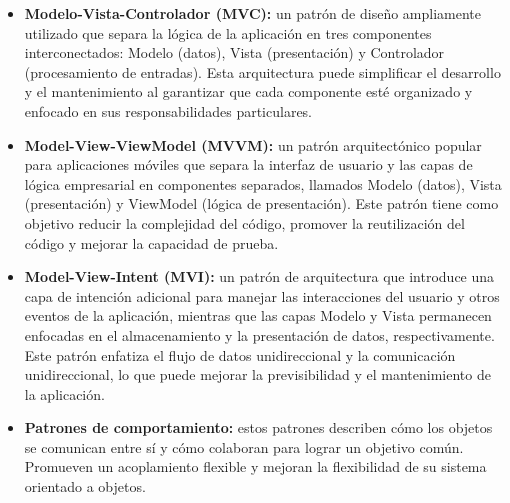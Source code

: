 \documentclass{article}
\begin{document}
	\begin{itemize}
		\item \textbf{Modelo-Vista-Controlador (MVC):} un patrón de diseño ampliamente utilizado que separa la lógica de la aplicación en tres componentes interconectados: Modelo (datos), Vista (presentación) y Controlador (procesamiento de entradas). Esta arquitectura puede simplificar el desarrollo y el mantenimiento al garantizar que cada componente esté organizado y enfocado en sus responsabilidades particulares.
		
		\item \textbf{Model-View-ViewModel (MVVM):} un patrón arquitectónico popular para aplicaciones móviles que separa la interfaz de usuario y las capas de lógica empresarial en componentes separados, llamados Modelo (datos), Vista (presentación) y ViewModel (lógica de presentación). Este patrón tiene como objetivo reducir la complejidad del código, promover la reutilización del código y mejorar la capacidad de prueba.
		
		\item \textbf{Model-View-Intent (MVI):} un patrón de arquitectura que introduce una capa de intención adicional para manejar las interacciones del usuario y otros eventos de la aplicación, mientras que las capas Modelo y Vista permanecen enfocadas en el almacenamiento y la presentación de datos, respectivamente. Este patrón enfatiza el flujo de datos unidireccional y la comunicación unidireccional, lo que puede mejorar la previsibilidad y el mantenimiento de la aplicación.
		
		\item \textbf{Patrones de comportamiento:} estos patrones describen cómo los objetos se comunican entre sí y cómo colaboran para lograr un objetivo común. Promueven un acoplamiento flexible y mejoran la flexibilidad de su sistema orientado a objetos.
	\end{itemize}
	
\end{document}
